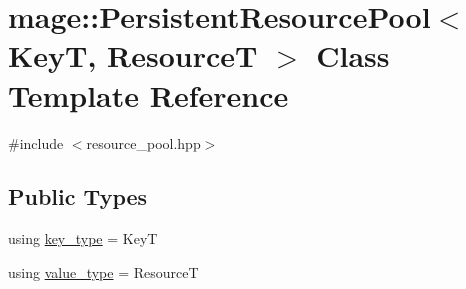 \hypertarget{classmage_1_1_persistent_resource_pool}{}\section{mage\+:\+:Persistent\+Resource\+Pool$<$ KeyT, ResourceT $>$ Class Template Reference}
\label{classmage_1_1_persistent_resource_pool}


{\ttfamily \#include $<$resource\+\_\+pool.\+hpp$>$}

\subsection*{Public Types}
\begin{DoxyCompactItemize}
\item 
using \mbox{\hyperlink{classmage_1_1_persistent_resource_pool_a8041d9d11d2307efc6d5b6dd43074e0c}{key\+\_\+type}} = KeyT
\item 
using \mbox{\hyperlink{classmage_1_1_persistent_resource_pool_a2311ac7d92bb3c23950c2d88e9213d16}{value\+\_\+type}} = ResourceT
\end{DoxyCompactItemize}
